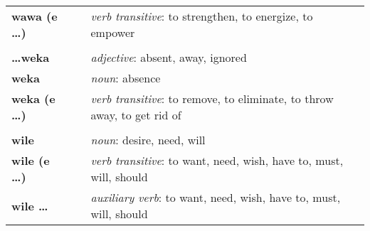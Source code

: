\begin{supertabular}{p{2,5cm}|ll}
    \textbf{wawa (e \dots)}      &  & \textit{verb transitive}: to strengthen, to energize, to empower                                           \\
                                 &  &                                                                                                            \\
    \textbf{\dots weka}          &  & \textit{adjective}: absent, away, ignored                                                                  \\
    \textbf{weka}                &  & \textit{noun}: absence                                                                                     \\
    \textbf{weka (e \dots)}      &  & \textit{verb transitive}: to remove, to eliminate, to throw away, to get rid of                            \\
                                 &  &                                                                                                            \\
    \textbf{wile}                &  & \textit{noun}: desire, need, will                                                                          \\
    \textbf{wile (e \dots)}      &  & \textit{verb transitive}: to want, need, wish, have to, must, will, should                                 \\
    \textbf{wile \dots}          &  & \textit{auxiliary verb}: to want, need, wish, have to, must, will, should                                  \\
\end{supertabular}
